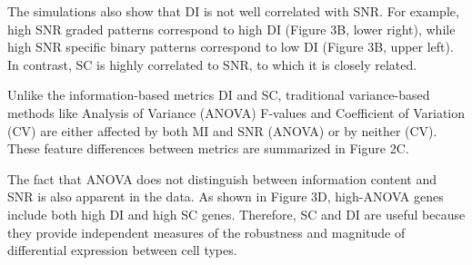 The simulations also show that DI is not well correlated with SNR. For example, high SNR graded patterns correspond to high DI (Figure 3B, lower right), while high SNR specific binary patterns correspond to low DI (Figure 3B, upper left). In contrast, SC is highly correlated to SNR, to which it is closely related. 

Unlike the information-based metrics DI and SC, traditional variance-based methods like Analysis of Variance (ANOVA) F-values and Coefficient of Variation (CV) are either affected by both MI and SNR (ANOVA) or by neither (CV).  These feature differences between metrics are summarized in Figure 2C.

The fact that ANOVA does not distinguish between information content and SNR is also apparent in the data. As shown in Figure 3D, high-ANOVA genes include both high DI and high SC genes. Therefore, SC and DI are useful because they provide independent measures of the robustness and magnitude of differential expression between cell types.